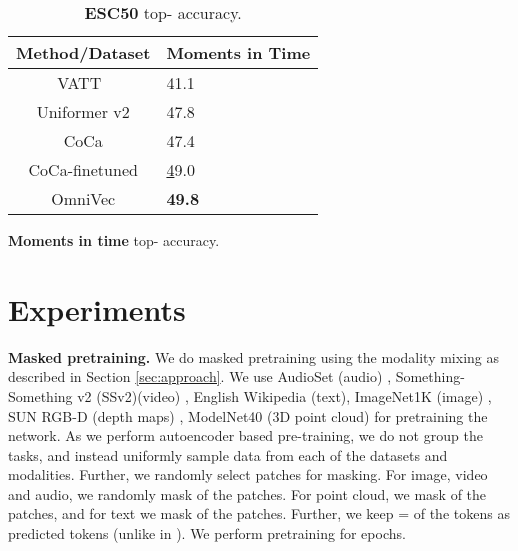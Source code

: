 \begin{table*}
{{\begin{tabular}{cm{4em}}
\hline
\textbf{Method/Dataset} & \textbf{Moments in Time} \\
\hline
VATT~\cite{akbari2021vatt}                    & 41.1                     \\
Uniformer v2\cite{li2022uniformerv2}           & 47.8                     \\
CoCa\cite{yu2022coca}                    & 47.4                     \\
CoCa-finetuned\cite{yu2022coca}          & {\ul 49.0}               \\
\hline
OmniVec                 & \textbf{49.8} \\
\hline
\end{tabular}
}
\caption{\textbf{Moments in time} top- accuracy.
}
\label{tab:sota_MIT}
}
\hspace{0.5em}
\parbox{0.4\columnwidth}{
\caption{\textbf{ESC50} top- accuracy. 
}
\label{tab:sota_audio}
}
\hspace{1em}
\parbox{0.45\columnwidth}{
\resizebox{0.45\columnwidth}{!}{

}
}
\end{table*}



\section{Experiments}
\label{sec:experiments}


\noindent\textbf{Masked pretraining.} We do masked pretraining using the modality mixing as described in Section \ref{sec:approach}. We use AudioSet (audio) \cite{gemmeke2017audio}, Something-Something v2 (SSv2)(video) \cite{goyal2017something}, English Wikipedia (text), ImageNet1K (image) \cite{deng2009imagenet}, SUN RGB-D (depth maps) \cite{song2015sun}, ModelNet40 (3D point cloud) \cite{wu20153d} for pretraining the network.  As we perform autoencoder based pre-training, we do not group the tasks, and instead uniformly sample data from each of the datasets and modalities. Further, we randomly select patches for masking. For image, video and audio, we randomly mask  of the patches. For point cloud, we mask  of the patches, and for text we mask  of the patches. Further, we keep  =  of the tokens as predicted tokens (unlike  in \cite{yang2021generalized}). We perform pretraining for  epochs.  

